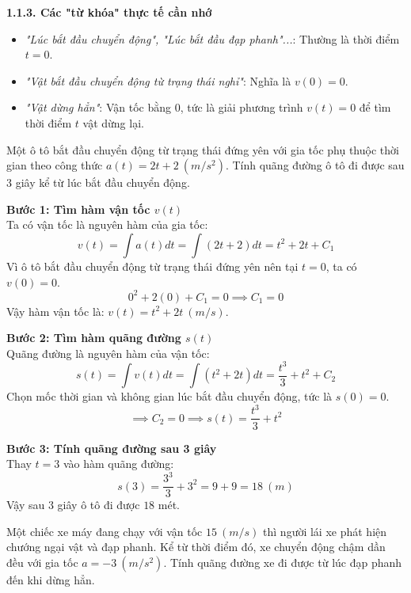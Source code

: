 \documentclass[12pt]{article}
\begin{document}
	\textbf{1.1.3. Các "từ khóa" thực tế cần nhớ}
	\begin{itemize}
		\item \textit{"Lúc bắt đầu chuyển động", "Lúc bắt đầu đạp phanh"...}: Thường là thời điểm $t = 0$.
		\item \textit{"Vật bắt đầu chuyển động từ trạng thái nghỉ"}: Nghĩa là $v(0) = 0$.
		\item \textit{"Vật dừng hẳn"}: Vận tốc bằng 0, tức là giải phương trình $v(t) = 0$ để tìm thời điểm $t$ vật dừng lại.
	\end{itemize}
	
	\begin{vidu}[1]
		Một ô tô bắt đầu chuyển động từ trạng thái đứng yên với gia tốc phụ thuộc thời gian theo công thức $a(t) = 2t + 2 \ (m/s^2)$. Tính quãng đường ô tô đi được sau 3 giây kể từ lúc bắt đầu chuyển động.
	\end{vidu}
	
	\begin{loigiai}
		\textbf{Bước 1: Tìm hàm vận tốc $v(t)$} \\
		Ta có vận tốc là nguyên hàm của gia tốc:
		$$v(t) = \int a(t)dt = \int (2t + 2)dt = t^2 + 2t + C_1$$
		Vì ô tô bắt đầu chuyển động từ trạng thái đứng yên nên tại $t = 0$, ta có $v(0) = 0$.
		$$0^2 + 2(0) + C_1 = 0 \implies C_1 = 0$$
		Vậy hàm vận tốc là: $v(t) = t^2 + 2t \ (m/s)$.
		
		\textbf{Bước 2: Tìm hàm quãng đường $s(t)$} \\
		Quãng đường là nguyên hàm của vận tốc:
		$$s(t) = \int v(t)dt = \int (t^2 + 2t)dt = \frac{t^3}{3} + t^2 + C_2$$
		Chọn mốc thời gian và không gian lúc bắt đầu chuyển động, tức là $s(0) = 0$.
		$$\implies C_2 = 0 \implies s(t) = \frac{t^3}{3} + t^2$$
		
		\textbf{Bước 3: Tính quãng đường sau 3 giây} \\
		Thay $t = 3$ vào hàm quãng đường:
		$$s(3) = \frac{3^3}{3} + 3^2 = 9 + 9 = 18 \ (m)$$
		Vậy sau 3 giây ô tô đi được $18$ mét.
	\end{loigiai}
	
	\begin{vidu}[2]
		Một chiếc xe máy đang chạy với vận tốc $15 \ (m/s)$ thì người lái xe phát hiện chướng ngại vật và đạp phanh. Kể từ thời điểm đó, xe chuyển động chậm dần đều với gia tốc $a = -3 \ (m/s^2)$. Tính quãng đường xe đi được từ lúc đạp phanh đến khi dừng hẳn.
	\end{vidu}
	
\end{document}
